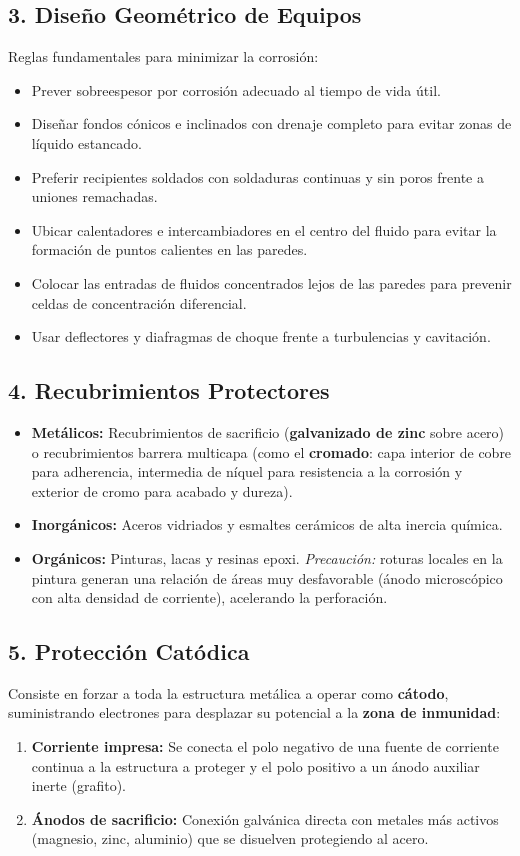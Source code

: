 \subsection{3. Diseño Geométrico de Equipos}
Reglas fundamentales para minimizar la corrosión:
\begin{itemize}
    \item Prever sobreespesor por corrosión adecuado al tiempo de vida útil.
    \item Diseñar fondos cónicos e inclinados con drenaje completo para evitar zonas de líquido estancado.
    \item Preferir recipientes soldados con soldaduras continuas y sin poros frente a uniones remachadas.
    \item Ubicar calentadores e intercambiadores en el centro del fluido para evitar la formación de puntos calientes en las paredes.
    \item Colocar las entradas de fluidos concentrados lejos de las paredes para prevenir celdas de concentración diferencial.
    \item Usar deflectores y diafragmas de choque frente a turbulencias y cavitación.
\end{itemize}

\subsection{4. Recubrimientos Protectores}
\begin{itemize}
    \item \textbf{Metálicos:} Recubrimientos de sacrificio (\textbf{galvanizado de zinc} sobre acero) o recubrimientos barrera multicapa (como el \textbf{cromado}: capa interior de cobre para adherencia, intermedia de níquel para resistencia a la corrosión y exterior de cromo para acabado y dureza).
    \item \textbf{Inorgánicos:} Aceros vidriados y esmaltes cerámicos de alta inercia química.
    \item \textbf{Orgánicos:} Pinturas, lacas y resinas epoxi. \textit{Precaución:} roturas locales en la pintura generan una relación de áreas muy desfavorable (ánodo microscópico con alta densidad de corriente), acelerando la perforación.
\end{itemize}

\subsection{5. Protección Catódica}
Consiste en forzar a toda la estructura metálica a operar como \textbf{cátodo}, suministrando electrones para desplazar su potencial a la \textbf{zona de inmunidad}:
\begin{enumerate}
    \item \textbf{Corriente impresa:} Se conecta el polo negativo de una fuente de corriente continua a la estructura a proteger y el polo positivo a un ánodo auxiliar inerte (grafito).
    \item \textbf{Ánodos de sacrificio:} Conexión galvánica directa con metales más activos (magnesio, zinc, aluminio) que se disuelven protegiendo al acero.
\end{enumerate}

